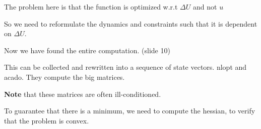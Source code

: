 \documentclass[a4paper]{article}
\begin{document}
The problem here is that the function is optimized w.r.t $ \Delta U $ and not $ u $

So we need to reformulate the dynamics and constraints such that it is dependent on $ \Delta U $.

Now we have found the entire computation. (slide 10)

This can be collected and rewritten into a sequence of state vectors. 
nlopt and acado. They compute the big matrices.

\textbf{Note} that these matrices are often ill-conditioned. 


To guarantee that there is a minimum, we need to compute the hessian, to verify that the problem is convex. 
\end{document}
